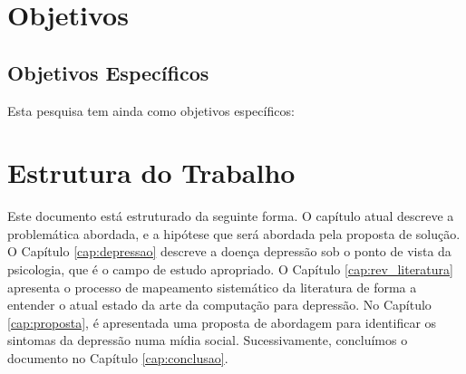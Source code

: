 




\section{Objetivos}
\label{sec:objetivos}

\subsection{Objetivos Específicos}
Esta pesquisa tem ainda como objetivos específicos:

\section{Estrutura do Trabalho}
\label{sec:organizacao}
Este documento está estruturado da seguinte forma. O capítulo atual descreve a problemática abordada, e a hipótese que será abordada pela proposta de solução.
O Capítulo \ref{cap:depressao} descreve a doença depressão sob o ponto de vista da psicologia, que é o campo de estudo apropriado.
O Capítulo \ref{cap:rev_literatura} apresenta o processo de mapeamento sistemático da literatura de forma a entender o atual estado da arte da computação para depressão.
No Capítulo \ref{cap:proposta}, é apresentada uma proposta de abordagem para identificar os sintomas da depressão numa mídia social. Sucessivamente, concluímos o documento no Capítulo \ref{cap:conclusao}.